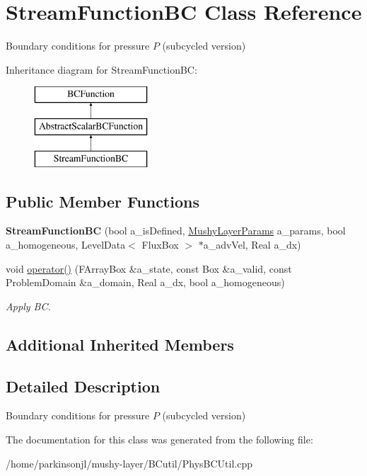 \hypertarget{class_stream_function_b_c}{\section{Stream\-Function\-B\-C Class Reference}
\label{class_stream_function_b_c}
}


Boundary conditions for pressure $P$ (subcycled version)  


Inheritance diagram for Stream\-Function\-B\-C\-:\begin{figure}[H]
\begin{center}
\leavevmode
\includegraphics[height=3.000000cm]{class_stream_function_b_c}
\end{center}
\end{figure}
\subsection*{Public Member Functions}
\begin{DoxyCompactItemize}
\item 
\hypertarget{class_stream_function_b_c_a48da0de78c77018a8607988d836ffed0}{{\bfseries Stream\-Function\-B\-C} (bool a\-\_\-is\-Defined, \hyperlink{class_mushy_layer_params}{Mushy\-Layer\-Params} a\-\_\-params, bool a\-\_\-homogeneous, Level\-Data$<$ Flux\-Box $>$ $\ast$a\-\_\-adv\-Vel, Real a\-\_\-dx)}\label{class_stream_function_b_c_a48da0de78c77018a8607988d836ffed0}

\item 
\hypertarget{class_stream_function_b_c_ad87081663cc380e95de4fba24ddc4e39}{void \hyperlink{class_stream_function_b_c_ad87081663cc380e95de4fba24ddc4e39}{operator()} (F\-Array\-Box \&a\-\_\-state, const Box \&a\-\_\-valid, const Problem\-Domain \&a\-\_\-domain, Real a\-\_\-dx, bool a\-\_\-homogeneous)}\label{class_stream_function_b_c_ad87081663cc380e95de4fba24ddc4e39}

\begin{DoxyCompactList}\small\item\em Apply B\-C. \end{DoxyCompactList}\end{DoxyCompactItemize}
\subsection*{Additional Inherited Members}


\subsection{Detailed Description}
Boundary conditions for pressure $P$ (subcycled version) 

The documentation for this class was generated from the following file\-:\begin{DoxyCompactItemize}
\item 
/home/parkinsonjl/mushy-\/layer/\-B\-Cutil/Phys\-B\-C\-Util.\-cpp\end{DoxyCompactItemize}
